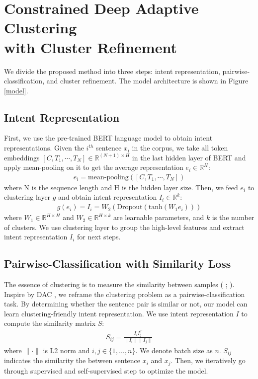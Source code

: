\documentclass[letterpaper]{article} \usepackage{aaai20}  \usepackage{times}  \usepackage{helvet} \usepackage{courier}  \usepackage[hyphens]{url}  \usepackage{graphicx} \urlstyle{rm} \def\UrlFont{\rm}  \usepackage{graphicx}  \frenchspacing  \setlength{\pdfpagewidth}{8.5in}  \setlength{\pdfpageheight}{11in}
\begin{document}
\section{Constrained Deep Adaptive Clustering \\ with Cluster Refinement}
We divide the proposed method into three steps: intent representation, pairwise-classification, and cluster refinement. The model architecture is shown in Figure \ref{model}.
\subsection{Intent Representation}
First, we use the pre-trained BERT language model to obtain intent representations. Given the $i^{th}$ sentence $x_i$ in the corpus, we take all token embeddings $[C, T_1, \cdots, T_N] \in \mathds R^{(N+1) \times H}$ in the last hidden layer of BERT and apply mean-pooling on it to get the average representation $e_i \in \mathds R^{H}$:
\begin{align}
    e_i = \text{mean-pooling}([C, T_1, \cdots, T_N]) 
\end{align}
where N is the sequence length and H is the hidden layer size. Then, we feed $e_i$ to clustering layer $g$ and obtain intent representation $I_i \in \mathds R^{k}$:
\begin{align}
    g(e_i) = I_i = W_2 ( \text{Dropout}(\text{tanh}(W_1 e_i)))
\end{align}
where $ W_1 \in \mathds R^{H \times H}$ and  $W_2 \in \mathds R^{H \times k}$ are learnable parameters, and $k$ is the number of clusters. We use clustering layer to group the high-level features and extract intent representation $I_i$ for next steps.

\subsection{Pairwise-Classification with Similarity Loss}
The essence of clustering is to measure the similarity between samples (\citeauthor{haponchyk2018supervised} \citeyear{haponchyk2018supervised}; \citeauthor{poddar2019train} \citeyear{poddar2019train}). Inspire by DAC \cite{chang2017deep}, we reframe the clustering problem as a pairwise-classification task. By determining whether the sentence pair is similar or not, our model can learn clustering-friendly intent representation. We use intent representation $I$ to compute the similarity matrix $S$:
\begin{align}
    S_{ij} = \frac{I_i I_j^T}{\| I_i \parallel \| I_j \parallel}
\end{align}
where $\|\cdot\|$ is L2 norm and $i, j \in \{1, \dots , n\}$. We denote batch size as $n$. $S_{ij}$ indicates the similarity the between sentence ${x_i}$ and $x_j$. Then, we iteratively go through supervised and self-supervised step to optimize the model.
\end{document}
